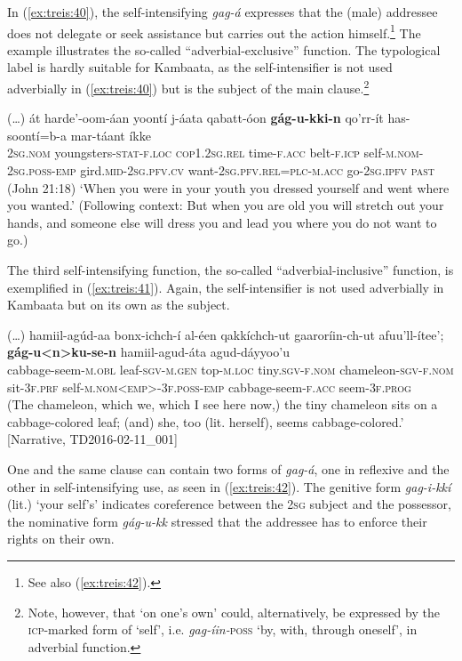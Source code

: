 \documentclass[output=paper]{langscibook}
\begin{document}
In (\ref{ex:treis:40}), the self-intensifying \textit{gag-á} expresses that the (male) addressee does not delegate or seek assistance but carries out the action himself.\footnote{See also (\ref{ex:treis:42}).} The example illustrates the so-called “adverbial-exclusive” function. The typological label is hardly suitable for Kambaata, as the self-intensifier is not used adverbially in (\ref{ex:treis:40}) but is the subject of the main clause.\footnote{Note, however, that ‘on one’s own’ could, alternatively, be expressed by the \textsc{icp-}marked form of ‘self’, i.e. \textit{gag-íin-}\textsc{poss} ‘by, with, through oneself’, in adverbial function.}

\ea\label{ex:treis:40} 
\gll (…) át harde’-oom-áan yoontí j-áata qabatt-óon \textbf{gág-u-kki-n} qo’rr-ít has-soontí=b-a mar-táant íkke\\
     {} \textsc{2sg.nom} youngsters-\textsc{stat-f.loc} \textsc{cop1.2sg.rel} time-\textsc{f.acc} belt-\textsc{f.icp} self-\textsc{m.nom-2sg.poss-emp} gird.\textsc{mid}-\textsc{2sg.pfv.cv} want-\textsc{2sg.pfv.rel=plc-m.acc} go-2\textsc{sg.ipfv} \textsc{past}\\
\glt (John 21:18) ‘When you were in your youth you dressed yourself and went where you wanted.’ (Following context: But when you are old you will stretch out your hands, and someone else will dress you and lead you where you do not want to go.) \citep[95]{KHTPH2005}\z

The third self-intensifying function, the so-called “adverbial-inclusive” function, is exemplified in (\ref{ex:treis:41}). Again, the self-intensifier is not used adverbially in Kambaata but on its own as the subject.

\ea\label{ex:treis:41} 
\gll (…) hamiil-agúd-aa bonx-ichch-í al-éen qakkíchch-ut gaaroríin-ch-ut afuu’ll-ítee’; \textbf{gág-u<n>ku-se-n} hamiil-agud-áta agud-dáyyoo’u \\
     {} cabbage-seem-\textsc{m.obl} leaf-\textsc{sgv-m.gen} top-\textsc{m.loc} tiny.\textsc{sgv-f.nom} chameleon-\textsc{sgv-f.nom} sit-\textsc{3f.prf} self-\textsc{m.nom<emp>-3f.poss-emp} cabbage-seem-\textsc{f.acc} seem-\textsc{3f.prog}\\
\glt (The chameleon, which we, which I see here now,) the tiny chameleon sits on a cabbage-colored leaf; (and) she, too (lit. herself), seems cabbage-colored.’ [Narrative, TD2016-02-11\_001]\z

One and the same clause can contain two forms of \textit{gag-á}, one in reflexive and the other in self-intensifying use, as seen in (\ref{ex:treis:42}). The genitive form \textit{gag-i-kkí} (lit.) ‘your self’s’ indicates coreference between the \textsc{2sg} subject and the possessor, the nominative form \textit{gág-u-kk} stressed that the addressee has to enforce their rights on their own.
\end{document}
